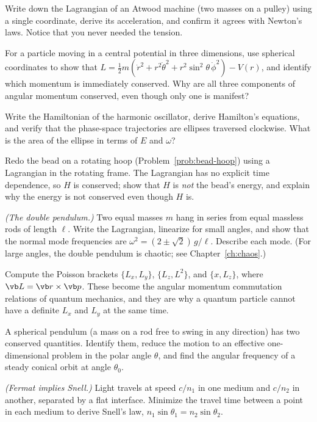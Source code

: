 \begin{problems}
 Write down the Lagrangian of an Atwood machine (two masses on a pulley) using a single coordinate, derive its acceleration, and confirm it agrees with Newton's laws. Notice that you never needed the tension.

\core For a particle moving in a central potential in three dimensions, use spherical coordinates to show that $L = \tfrac12 m(\dot r^2 + r^2\dot\theta^2 + r^2\sin^2\theta\,\dot\phi^2) - V(r)$, and identify which momentum is immediately conserved. Why are all three components of angular momentum conserved, even though only one is manifest?

 Write the Hamiltonian of the harmonic oscillator, derive Hamilton's equations, and verify that the phase-space trajectories are ellipses traversed clockwise. What is the area of the ellipse in terms of $E$ and $\omega$?

 Redo the bead on a rotating hoop (Problem~\ref{prob:bead-hoop}) using a Lagrangian in the rotating frame. The Lagrangian has no explicit time dependence, so $H$ is conserved; show that $H$ is \emph{not} the bead's energy, and explain why the energy is not conserved even though $H$ is.

\core \emph{(The double pendulum.)} Two equal masses $m$ hang in series from equal massless rods of length $\ell$. Write the Lagrangian, linearize for small angles, and show that the normal mode frequencies are $\omega^2 = (2\pm\sqrt2)\,g/\ell$. Describe each mode. (For large angles, the double pendulum is chaotic; see Chapter~\ref{ch:chaos}.)

\core Compute the Poisson brackets $\{L_x, L_y\}$, $\{L_z, L^2\}$, and $\{x, L_z\}$, where $\vb L = \vb r\times\vb p$. These become the angular momentum commutation relations of quantum mechanics, and they are why a quantum particle cannot have a definite $L_x$ and $L_y$ at the same time.

 A spherical pendulum (a mass on a rod free to swing in any direction) has two conserved quantities. Identify them, reduce the motion to an effective one-dimensional problem in the polar angle $\theta$, and find the angular frequency of a steady conical orbit at angle $\theta_0$.

 \emph{(Fermat implies Snell.)} Light travels at speed $c/n_1$ in one medium and $c/n_2$ in another, separated by a flat interface. Minimize the travel time between a point in each medium to derive Snell's law, $n_1\sin\theta_1 = n_2\sin\theta_2$.


\end{problems}
